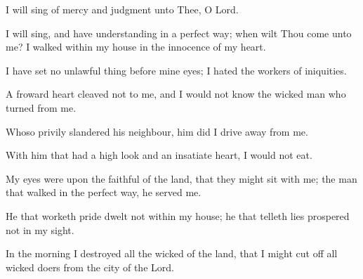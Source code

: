 I will sing of mercy and judgment unto Thee, O Lord.

I will sing, and have understanding in a perfect way; when wilt Thou come unto me? I walked within my house in the innocence of my heart.

I have set no unlawful thing before mine eyes; I hated the workers of iniquities.

A froward heart cleaved not to me, and I would not know the wicked man who turned from me.

Whoso privily slandered his neighbour, him did I drive away from me.

With him that had a high look and an insatiate heart, I would not eat.

My eyes were upon the faithful of the land, that they might sit with me; the man that walked in the perfect way, he served me.

He that worketh pride dwelt not within my house; he that telleth lies prospered not in my sight.

In the morning I destroyed all the wicked of the land, that I might cut off all wicked doers from the city of the Lord.

